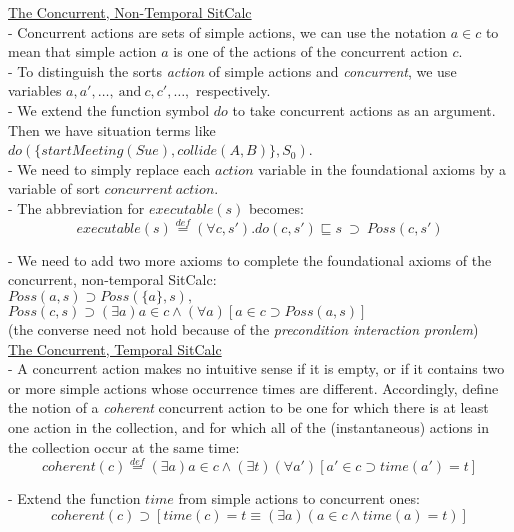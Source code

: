 \documentclass[fleqn]{report}
\begin{document}
\underline{The Concurrent, Non-Temporal SitCalc}\\

- Concurrent actions are sets of simple actions, we can use the notation $a \in c$ to mean that simple action $a$ is one of the actions of the concurrent action $c$.\\

- To distinguish the sorts \emph{action} of simple actions and \emph{concurrent}, we use variables $a, a', \ldots , \ \text{and} \ c, c', \ldots,$ respectively.\\

- We extend the function symbol $do$ to take concurrent actions as an argument. Then we have situation terms like $do(\{startMeeting(Sue), collide(A, B)\}, S_0)$.\\

- We need to simply replace each $action$ variable in the foundational axioms by a variable of sort $concurrent \ action$.\\

- The abbreviation for $executable(s)$ becomes:\vspace{-.3cm} \[executable(s)\stackrel{def}{=}(\forall c,s').do(c,s')\sqsubseteq s \ \supset \ Poss(c,s')\]

- We need to add two more axioms to complete the foundational axioms of the concurrent, non-temporal SitCalc:\\
$Poss(a,s)\supset Poss(\{a\},s),$\\
$Poss(c,s)\supset (\exists a)a\in c\land (\forall a)[a\in c\supset Poss(a,s)]$\\
(the converse need not hold because of the \emph{precondition interaction pronlem})\\

\underline{The Concurrent, Temporal SitCalc}\\

- A concurrent action makes no intuitive sense if it is empty, or if it contains two or more simple actions whose occurrence times are different. 
Accordingly, define the notion of a \emph{coherent} concurrent action to be one for which there is at least one action in the collection, and for which all of the (instantaneous) actions in the collection occur at the same time:
\vspace{-.3cm}
\[coherent(c)\stackrel{def}{=}(\exists a)a\in c\land (\exists t)(\forall a')[a'\in c \supset time(a')=t]\]

- Extend the function $time$ from simple actions to concurrent ones:\vspace{-.3cm}
\[coherent(c)\supset [time(c)=t \equiv (\exists a)(a\in c \land time(a)=t)]\]
\end{document}
